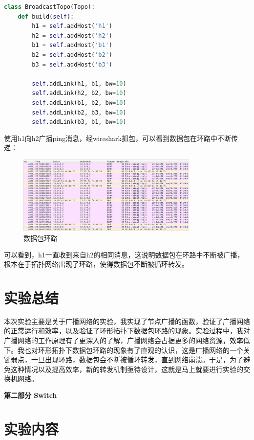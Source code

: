 \documentclass[UTF8]{report}
\begin{document}
\begin{lstlisting}[language=Python]
    class BroadcastTopo(Topo):
    def build(self):
        h1 = self.addHost('h1')
        h2 = self.addHost('h2')
        b1 = self.addHost('b1')
        b2 = self.addHost('b2')
        b3 = self.addHost('b3')

        self.addLink(h1, b1, bw=10)
        self.addLink(h2, b2, bw=10)
        self.addLink(b1, b2, bw=10)
        self.addLink(b2, b3, bw=10)
        self.addLink(b3, b1, bw=10)
\end{lstlisting}

使用h1向h2广播ping消息，经wireshark抓包，可以看到数据包在环路中不断传递：

\begin{figure}[H]
    \centering
    \includegraphics[width=0.8\textwidth]{ring.png}
    \caption{数据包环路}
\end{figure}

可以看到，h1一直收到来自h2的相同消息，这说明数据包在环路中不断被广播，根本在于拓扑网络出现了环路，使得数据包不断被循环转发。

\section{实验总结}

本次实验主要是关于广播网络的实验，我实现了节点广播的函数，验证了广播网络的正常运行和效率，以及验证了环形拓扑下数据包环路的现象。实验过程中，我对广播网络的工作原理有了更深入的了解，广播网络会占据更多的网络资源，效率低下。我也对环形拓扑下数据包环路的现象有了直观的认识，这是广播网络的一个关键弱点，一旦出现环路，数据包会不断被循环转发，直到网络崩溃。于是，为了避免这种情况以及提高效率，新的转发机制亟待设计，这就是马上就要进行实验的交换机网络。

\newpage
\setcounter{section}{0}
\begin{center}
    \Large \bf 第二部分 \quad Switch
\end{center}

\section{实验内容}
\end{document}
